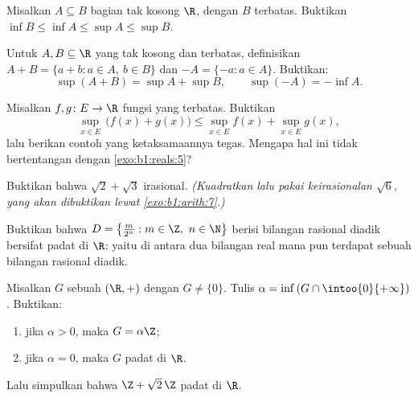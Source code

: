 \begin{exercise}[$\star$]\label{exo:b1:reals:4}
Misalkan $A \subseteq B$  bagian tak kosong $\R$, dengan $B$ terbatas. Buktikan
$\inf B \leq \inf A \leq \sup A \leq \sup B$.
\end{exercise}

\begin{exercise}[$\star\star$]\label{exo:b1:reals:5}
Untuk $A, B \subseteq \R$ yang tak kosong dan terbatas, definisikan $A + B = \{a + b : a
\in A,\ b \in B\}$ dan $-A = \{-a : a \in A\}$. Buktikan:
\[
\sup(A + B) = \sup A + \sup B,
\qquad
\sup(-A) = -\inf A .
\]
\end{exercise}

\begin{exercise}[$\star\star$]\label{exo:b1:reals:6}
Misalkan $f, g \colon E \to \R$ fungsi yang terbatas. Buktikan
\[
\sup_{x \in E}\, \bigl(f(x) + g(x)\bigr) \leq \sup_{x \in E} f(x) +
\sup_{x \in E} g(x),
\]
lalu berikan contoh yang ketaksamaannya tegas. Mengapa hal ini tidak
bertentangan dengan \cref{exo:b1:reals:5}?
\end{exercise}

\begin{exercise}[$\star\star$]\label{exo:b1:reals:7}
Buktikan bahwa $\sqrt 2 + \sqrt 3$ irasional. \emph{(Kuadratkan lalu
pakai keirasionalan $\sqrt 6$, yang akan dibuktikan lewat
\cref{exo:b1:arith:7}.)}
\end{exercise}

\begin{exercise}[$\star\star$]\label{exo:b1:reals:8}
Buktikan bahwa  $D = \bigl\{\frac{m}{2^n} : m \in \Z,\ n \in
\N\bigr\}$ berisi bilangan rasional diadik bersifat padat di $\R$: yaitu di antara dua
bilangan real mana pun terdapat sebuah bilangan rasional diadik.
\end{exercise}

\begin{exercise}[$\star\star\star$]\label{exo:b1:reals:9}
Misalkan $G$ sebuah  $(\R, +)$ dengan $G \neq \{0\}$. Tulis $\alpha =
\inf\,(G \cap \intoo{0}{+\infty})$. Buktikan:
\begin{enumerate}
  \item jika $\alpha > 0$, maka $G = \alpha\Z$;
  \item jika $\alpha = 0$, maka $G$ padat di $\R$.
\end{enumerate}
Lalu simpulkan bahwa $\Z + \sqrt 2\,\Z$ padat di $\R$.
\end{exercise}

